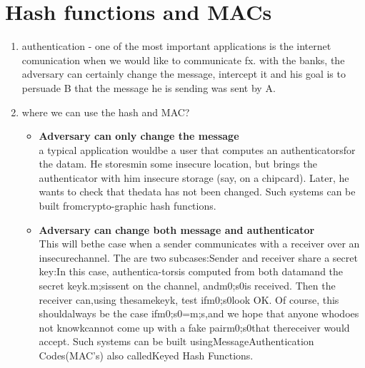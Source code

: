 \documentclass[a4paper,10pt]{article}
\begin{document}
\section*{Hash functions and MACs}
\begin{enumerate}
\item authentication - one of the most important applications is the internet comunication when we would like to communicate fx. with the banks, the adversary can certainly change the message, intercept it and his goal is to persuade B that the message he is sending was sent by A.

\item where we can use the hash and MAC?
\begin{itemize}
\item[]\textbf{Adversary can only change the message}\\
a  typical  application  wouldbe a user that computes an authenticatorsfor the datam.  He storesmin some insecure location, but brings the authenticator with him insecure storage (say, on a chipcard).  Later, he wants to check that thedata  has not  been  changed.   Such  systems  can be  built  fromcrypto-graphic hash functions.
\item[]\textbf{Adversary can change both message and authenticator}\\
This will bethe case when a sender communicates with a receiver over an insecurechannel.  The are two subcases:Sender and receiver share a secret key:In this case, authentica-torsis computed from both datamand the secret keyk.m;sissent on the channel, andm0;s0is received.  Then the receiver can,using thesamekeyk, test ifm0;s0look OK. Of course, this shouldalways be the case ifm0;s0=m;s,and we hope that anyone whodoes not knowkcannot come up with a fake pairm0;s0that thereceiver would accept.  Such systems can be built usingMessageAuthentication Codes(MAC's) also calledKeyed Hash Functions.
\end{itemize}
\end{enumerate}
\end{document}

